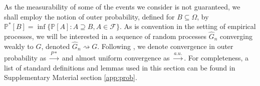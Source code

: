 \documentclass[11pt]{article}
\newcommand{\1}{\mathbf{1}}
\theoremstyle{definition}
\theoremstyle{remark}
\begin{document}
As the measurability of some of the events we consider is not guaranteed, we shall employ the notion of outer probability, defined for $B\subseteq\Omega$, by $\mathbb{P}^*[B]=\inf \{\mathbb{P}[A]: A \supseteq B, A \in \mathcal{F}\}$. As is convention in the setting of empirical processes, we will be interested in a sequence of random processes $\hat{G}_n$ converging weakly to $G$, denoted $\hat{G}_n\rightsquigarrow G$. Following \cite{van1996weak}, we denote convergence in outer probability as $\xrightarrow{P*}$ and almost uniform convergence as $\xrightarrow{a.u.}$. For completeness, a list of standard definitions and lemmas used in this section can be found in Supplementary Material section \ref{app:prob}.
\end{document}

